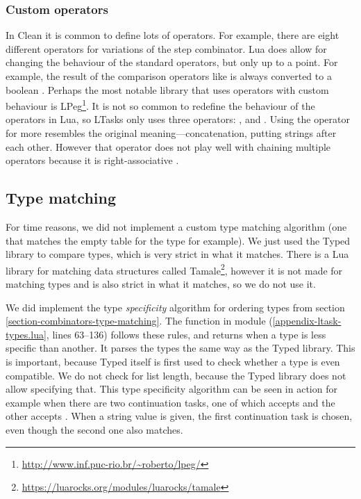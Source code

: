 \subsubsection{Custom operators}
In Clean it is common to define lots of operators. For example, there are eight different operators for variations of the step combinator. Lua does allow for changing the behaviour of the standard operators, but only up to a point. For example, the result of the comparison operators like \lua{<} is always converted to a boolean \cite{luareferencemanual}. Perhaps the most notable library that uses operators with custom behaviour is LPeg\footnote{\url{http://www.inf.puc-rio.br/~roberto/lpeg/}}. It is not so common to redefine the behaviour of the operators in Lua, so LTasks only uses three operators: \lua{~}, \lua{&} and \lua{|}. Using the  operator for  more resembles the original meaning---concatenation, putting strings after each other. However that operator does not play well with chaining multiple operators because it is right-associative \cite[\S 3.4.8]{luareferencemanual}.

\subsection{Type matching}
For time reasons, we did not implement a custom type matching algorithm (one that matches the empty table \lua{{}} for the type  for example). We just used the Typed library to compare types, which is very strict in what it matches. There is a Lua library for matching data structures called Tamale\footnote{\url{https://luarocks.org/modules/luarocks/tamale}}, however it is not made for matching types and is also strict in what it matches, so we do not use it.

We did implement the type \textit{specificity} algorithm for ordering types from section \ref{section-combinators-type-matching}. The function  in module  (\ref{appendix-ltask-types.lua}, lines 63--136) follows these rules, and returns  when a type is less specific than another. It parses the types the same way as the Typed library. This is important, because Typed itself is first used to check whether a type is even compatible. We do not check for list length, because the Typed library does not allow specifying that. This type specificity algorithm can be seen in action for example when there are two continuation tasks, one of which accepts  and the other accepts . When a string value is given, the first continuation task is chosen, even though the second one also matches.

